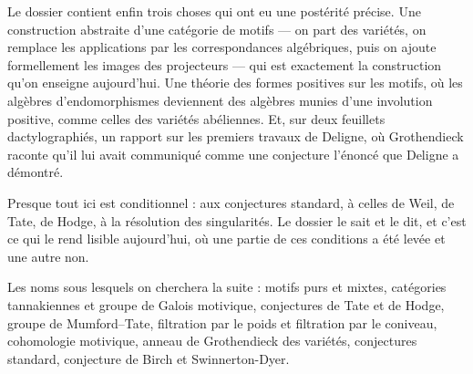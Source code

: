 \documentclass[11pt,a4paper]{article}
\begin{document}
\begin{resume}
Le dossier contient enfin trois choses qui ont eu une postérité précise. Une
construction abstraite d'une catégorie de motifs --- on part des variétés,
on remplace les applications par les correspondances algébriques, puis on
ajoute formellement les images des projecteurs --- qui est exactement la
construction qu'on enseigne aujourd'hui. Une théorie des formes positives
sur les motifs, où les algèbres d'endomorphismes deviennent des algèbres
munies d'une involution positive, comme celles des variétés abéliennes.
Et, sur deux feuillets dactylographiés, un rapport sur les premiers travaux
de Deligne, où Grothendieck raconte qu'il lui avait communiqué comme une
conjecture l'énoncé que Deligne a démontré.

Presque tout ici est conditionnel : aux conjectures standard, à celles de
Weil, de Tate, de Hodge, à la résolution des singularités. Le dossier le sait
et le dit, et c'est ce qui le rend lisible aujourd'hui, où une partie de ces
conditions a été levée et une autre non.

Les noms sous lesquels on cherchera la suite : motifs purs et mixtes,
catégories tannakiennes et groupe de Galois motivique, conjectures de Tate et
de Hodge, groupe de Mumford--Tate, filtration par le poids et filtration par
le coniveau, cohomologie motivique, anneau de Grothendieck des variétés,
conjectures standard, conjecture de Birch et Swinnerton-Dyer.


\end{resume}
\end{document}
